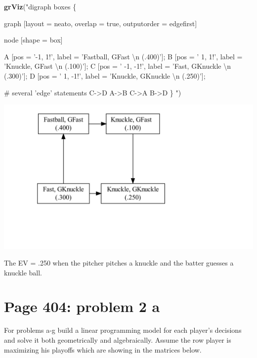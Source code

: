 \documentclass[]{article}
\newenvironment{Shaded}{\begin{snugshade}}{\end{snugshade}}
\newcommand{\KeywordTok}[1]{\textcolor[rgb]{0.13,0.29,0.53}{\textbf{{#1}}}}
\newcommand{\CharTok}[1]{\textcolor[rgb]{0.31,0.60,0.02}{{#1}}}
\newcommand{\StringTok}[1]{\textcolor[rgb]{0.31,0.60,0.02}{{#1}}}
\newcommand{\NormalTok}[1]{{#1}}
\begin{document}
\begin{Shaded}
\begin{Highlighting}[]
\KeywordTok{grViz}\NormalTok{(}\StringTok{"digraph boxes \{}

\StringTok{  graph [layout = neato, overlap = true, outputorder = edgefirst]}

\StringTok{  node [shape = box]}

\StringTok{  A [pos = '-1, 1!', label = 'Fastball, GFast }\CharTok{\textbackslash{}n}\StringTok{ (.400)']; }
\StringTok{  B [pos = ' 1, 1!', label = 'Knuckle, GFast  }\CharTok{\textbackslash{}n}\StringTok{ (.100)']; }
\StringTok{  C [pos = ' -1, -1!', label = 'Fast, GKnuckle }\CharTok{\textbackslash{}n}\StringTok{ (.300)']; }
\StringTok{  D [pos = ' 1, -1!', label = 'Knuckle, GKnuckle }\CharTok{\textbackslash{}n}\StringTok{ (.250)']; }

\StringTok{  # several 'edge' statements}
\StringTok{  C->D A->B C->A B->D}
\StringTok{\}}
\StringTok{"}\NormalTok{)}
\end{Highlighting}
\end{Shaded}

\includegraphics{Christophe_Hunt_hw9_files/figure-latex/unnamed-chunk-2-1.pdf}

The EV = .250 when the pitcher pitches a knuckle and the batter guesses
a knuckle ball.

\newpage

\section{Page 404: problem 2 a}\label{page-404-problem-2-a}

For problems a-g build a linear programming model for each player's
decisions and solve it both geometrically and algebraically. Assume the
row player is maximizing his playoffs which are showing in the matrices
below.
\end{document}
